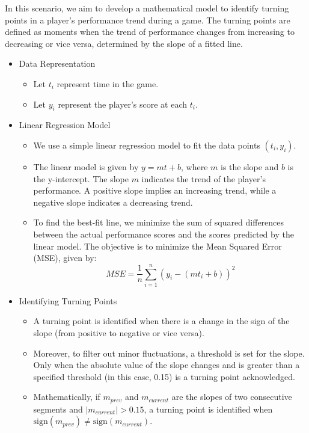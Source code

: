 \documentclass[11pt,a4paper]{article}
\begin{document}
	In this scenario, we aim to develop a mathematical model to identify turning points in a player's performance trend during a game. The turning points are defined as moments when the trend of performance changes from increasing to decreasing or vice versa, determined by the slope of a fitted line. 
	
	\begin{itemize}
		\item Data Representation
		\begin{itemize}
			\item Let \( t_i \) represent time in the game.
			\item Let \( y_i \) represent the player's score at each \( t_i \).
		\end{itemize}
		\item Linear Regression Model
		\begin{itemize}
			\item We use a simple linear regression model to fit the data points \((t_i, y_i)\).
			\item The linear model is given by \( y = mt + b \), where \( m \) is the slope and \( b \) is the y-intercept. The slope \( m \) indicates the trend of the player's performance. A positive slope implies an increasing trend, while a negative slope indicates a decreasing trend.
			\item To find the best-fit line, we minimize the sum of squared differences between the actual performance scores and the scores predicted by the linear model. The objective is to minimize the Mean Squared Error (MSE), given by:
			\[ MSE = \frac{1}{n} \sum_{i=1}^{n} (y_i - (mt_i + b))^2 \]
		\end{itemize}		
		\item Identifying Turning Points
		\begin{itemize}
			\item A turning point is identified when there is a change in the sign of the slope (from positive to negative or vice versa).
			\item Moreover, to filter out minor fluctuations, a threshold is set for the slope. Only when the absolute value of the slope changes and is greater than a specified threshold (in this case, 0.15) is a turning point acknowledged.
			\item Mathematically, if \( m_{prev} \) and \( m_{current} \) are the slopes of two consecutive segments and \( |m_{current}| > 0.15 \), a turning point is identified when \( \text{sign}(m_{prev}) \neq \text{sign}(m_{current}) \).
		\end{itemize}
	\end{itemize}
	
\end{document}
